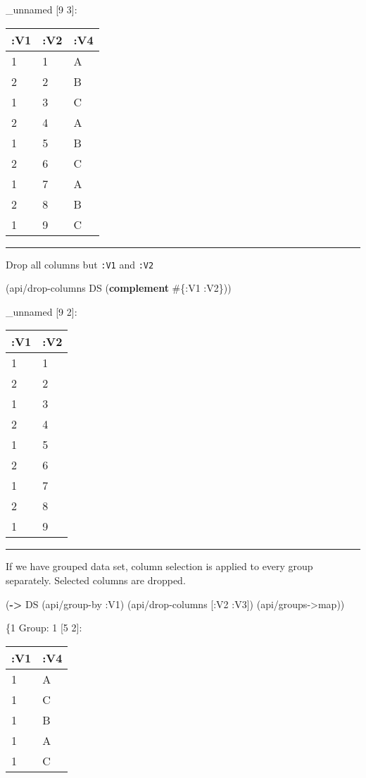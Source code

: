 \documentclass[]{article}
\newenvironment{Shaded}{\begin{snugshade}}{\end{snugshade}}
\newcommand{\KeywordTok}[1]{\textcolor[rgb]{0.13,0.29,0.53}{\textbf{#1}}}
\newcommand{\AttributeTok}[1]{\textcolor[rgb]{0.77,0.63,0.00}{#1}}
\newcommand{\NormalTok}[1]{#1}
\begin{document}
\_unnamed {[}9 3{]}:

\begin{longtable}[]{@{}lll@{}}
\toprule
:V1 & :V2 & :V4\tabularnewline
\midrule
\endhead
1 & 1 & A\tabularnewline
2 & 2 & B\tabularnewline
1 & 3 & C\tabularnewline
2 & 4 & A\tabularnewline
1 & 5 & B\tabularnewline
2 & 6 & C\tabularnewline
1 & 7 & A\tabularnewline
2 & 8 & B\tabularnewline
1 & 9 & C\tabularnewline
\bottomrule
\end{longtable}

\begin{center}\rule{0.5\linewidth}{0.5pt}\end{center}

Drop all columns but \texttt{:V1} and \texttt{:V2}

\begin{Shaded}
\begin{Highlighting}[]
\NormalTok{(api/drop-columns DS (}\KeywordTok{complement}\NormalTok{ #\{}\AttributeTok{:V1} \AttributeTok{:V2}\NormalTok{\}))}
\end{Highlighting}
\end{Shaded}

\_unnamed {[}9 2{]}:

\begin{longtable}[]{@{}ll@{}}
\toprule
:V1 & :V2\tabularnewline
\midrule
\endhead
1 & 1\tabularnewline
2 & 2\tabularnewline
1 & 3\tabularnewline
2 & 4\tabularnewline
1 & 5\tabularnewline
2 & 6\tabularnewline
1 & 7\tabularnewline
2 & 8\tabularnewline
1 & 9\tabularnewline
\bottomrule
\end{longtable}

\begin{center}\rule{0.5\linewidth}{0.5pt}\end{center}

If we have grouped data set, column selection is applied to every group
separately. Selected columns are dropped.

\begin{Shaded}
\begin{Highlighting}[]
\NormalTok{(}\KeywordTok{->}\NormalTok{ DS}
\NormalTok{    (api/group-by }\AttributeTok{:V1}\NormalTok{)}
\NormalTok{    (api/drop-columns [}\AttributeTok{:V2} \AttributeTok{:V3}\NormalTok{])}
\NormalTok{    (api/groups->map))}
\end{Highlighting}
\end{Shaded}

\{1 Group: 1 {[}5 2{]}:

\begin{longtable}[]{@{}ll@{}}
\toprule
:V1 & :V4\tabularnewline
\midrule
\endhead
1 & A\tabularnewline
1 & C\tabularnewline
1 & B\tabularnewline
1 & A\tabularnewline
1 & C\tabularnewline
\bottomrule
\end{longtable}
\end{document}
